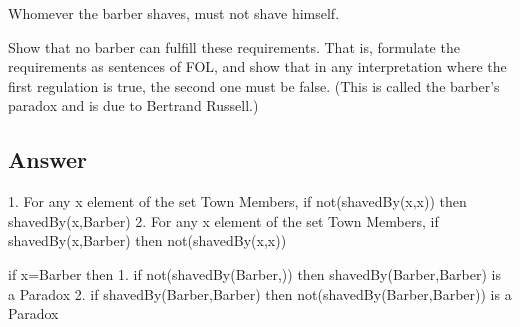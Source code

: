 \documentclass[10pt]{article}         %
\begin{document}
Whomever the barber shaves, must not shave himself.

Show that no barber can fulﬁll these requirements. That is, formulate the
requirements as sentences of FOL, and show that in any interpretation where
the ﬁrst regulation is true, the second one must be false.
(This is called the barber’s paradox and is due to Bertrand Russell.)

\subsection{Answer}
1. For any x element of the set Town Members, if not(shavedBy(x,x)) then shavedBy(x,Barber)
2. For any x element of the set Town Members, if shavedBy(x,Barber) then not(shavedBy(x,x))

if x=Barber then
1. if not(shavedBy(Barber,)) then shavedBy(Barber,Barber)  is a Paradox
2. if shavedBy(Barber,Barber) then not(shavedBy(Barber,Barber)) is a Paradox
\end{document}
